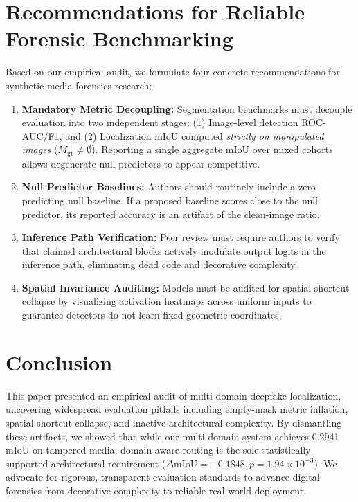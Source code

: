 \documentclass[conference]{IEEEtran}
\begin{document}



\section{Recommendations for Reliable Forensic Benchmarking}
Based on our empirical audit, we formulate four concrete recommendations for synthetic media forensics research:
\begin{enumerate}
    \item \textbf{Mandatory Metric Decoupling:} Segmentation benchmarks must decouple evaluation into two independent stages: (1) Image-level detection ROC-AUC/F1, and (2) Localization mIoU computed \textit{strictly on manipulated images} ($M_{\text{gt}} \neq \emptyset$). Reporting a single aggregate mIoU over mixed cohorts allows degenerate null predictors to appear competitive.
    \item \textbf{Null Predictor Baselines:} Authors should routinely include a zero-predicting null baseline. If a proposed baseline scores close to the null predictor, its reported accuracy is an artifact of the clean-image ratio.
    \item \textbf{Inference Path Verification:} Peer review must require authors to verify that claimed architectural blocks actively modulate output logits in the inference path, eliminating dead code and decorative complexity.
    \item \textbf{Spatial Invariance Auditing:} Models must be audited for spatial shortcut collapse by visualizing activation heatmaps across uniform inputs to guarantee detectors do not learn fixed geometric coordinates.
\end{enumerate}

\section{Conclusion}
This paper presented an empirical audit of multi-domain deepfake localization, uncovering widespread evaluation pitfalls including empty-mask metric inflation, spatial shortcut collapse, and inactive architectural complexity. By dismantling these artifacts, we showed that while our multi-domain system achieves 0.2941 mIoU on tampered media, domain-aware routing is the sole statistically supported architectural requirement ($\Delta\text{mIoU} = -0.1848, p = 1.94 \times 10^{-3}$). We advocate for rigorous, transparent evaluation standards to advance digital forensics from decorative complexity to reliable real-world deployment.



\end{document}
